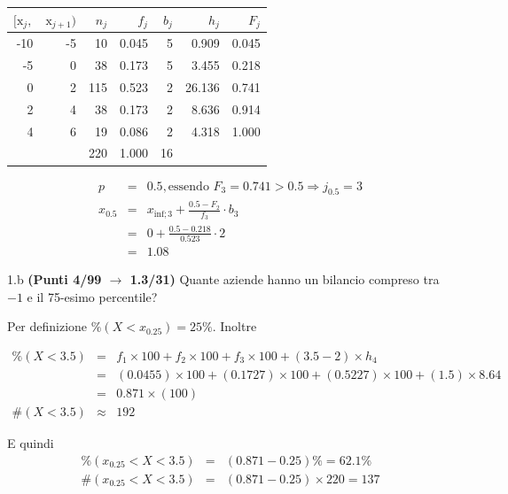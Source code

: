 \documentclass[
  11pt,
]{book}
\theoremstyle{mytheoremstyle}
\theoremstyle{mydefstyle}
\newenvironment{sol}
  {
  \begin{tcolorbox}[enhanced,breakable,arc=0.1mm,boxrule=1pt,colback=white,colframe=iblue,
  title=\bf \fontfamily{lmss}\selectfont \hspace{.5 cm} Soluzione,drop fuzzy shadow]

}{
\end{tcolorbox}
  }
\begin{document}
\begin{sol}

\begin{table}[H]
\centering
\begin{tabular}{rrrrrrr}
\toprule
$[\text{x}_j,$ & $\text{x}_{j+1})$ & $n_j$ & $f_j$ & $b_j$ & $h_j$ & $F_j$\\
\midrule
-10 & -5 & 10 & 0.045 & 5 & 0.909 & 0.045\\
-5 & 0 & 38 & 0.173 & 5 & 3.455 & 0.218\\
0 & 2 & 115 & 0.523 & 2 & 26.136 & 0.741\\
2 & 4 & 38 & 0.173 & 2 & 8.636 & 0.914\\
4 & 6 & 19 & 0.086 & 2 & 4.318 & 1.000\\
 &  & 220 & 1.000 & 16 &  & \\
\bottomrule
\end{tabular}
\end{table}

\begin{eqnarray*}
  p &=&  0.5 , \text{essendo }F_{ 3 }= 0.741  > 0.5  \Rightarrow j_{ 0.5 }= 3 \\
  x_{ 0.5 } &=& x_{\text{inf}; 3 } + \frac{ { 0.5 } - F_{ 2 }} {f_{ 3 }} \cdot b_{ 3 } \\
            &=&  0  + \frac {{ 0.5 } -  0.218 } { 0.523 } \cdot  2  \\
            &=&  1.08 
\end{eqnarray*}

\end{sol}

1.b \textbf{(Punti 4/99 \(\rightarrow\) 1.3/31)} Quante aziende hanno un bilancio compreso tra \(-1\) e il 75-esimo
percentile?

\begin{sol}
Per definizione \(\%(X<x_{ 0.25 })= 25 \%\). Inoltre

\begin{eqnarray*}
   \%(X< 3.5 ) &=&  f_{ 1 }\times 100+f_{ 2 }\times 100+f_{ 3 }\times 100 +( 3.5 - 2 )\times h_{ 4 } \\
                &=&  ( 0.0455 )\times 100+( 0.1727 )\times 100+( 0.5227 )\times 100 +( 1.5 )\times  8.64  \\
                &=&  0.871 \times(100) \\
\#(X< 3.5 )    &\approx& 192 
\end{eqnarray*}

E quindi
\begin{eqnarray*}
   \%( x_{0.25} < X < 3.5 ) &=& ( 0.871 - 0.25 )\%= 62.1 \% \\
   \#( x_{0.25} < X < 3.5 ) &=& ( 0.871 - 0.25 )\times  220 = 137  \\
\end{eqnarray*}

\end{sol}
\end{document}
